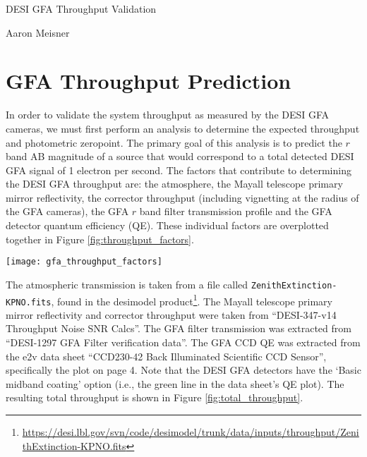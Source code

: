 \documentclass{article}
\begin{document}
\begin{center}
\Large
DESI GFA Throughput Validation
\end{center}

\normalsize

\begin{center}
Aaron Meisner
\end{center}

\section{GFA Throughput Prediction}


In order to validate the system throughput as measured by the DESI GFA cameras, we must first perform an analysis to determine the expected throughput and photometric zeropoint. The primary goal of this analysis is to predict the $r$ band AB magnitude of a source that would correspond to a total detected DESI GFA signal of 1 electron per second. The factors that contribute to determining the DESI GFA throughput are: the atmosphere, the Mayall telescope primary mirror reflectivity, the corrector throughput (including vignetting at the radius of the GFA cameras), the GFA $r$ band filter transmission profile and the GFA detector quantum efficiency (QE). These individual factors are overplotted together in Figure \ref{fig:throughput_factors}.



\begin{figure*}[ht]
        \texttt{[image: gfa\_throughput\_factors]}
    \caption{Summary of the multiplicative factors that contribute to determining the total DESI GFA throughput as a function of wavelength.}
    \label{fig:throughput_factors}
\end{figure*}

The atmospheric transmission is taken from a file called \verb|ZenithExtinction-KPNO.fits|, found in the desimodel product\footnote{\url{https://desi.lbl.gov/svn/code/desimodel/trunk/data/inputs/throughput/ZenithExtinction-KPNO.fits}}. The Mayall telescope primary mirror reflectivity and corrector throughput were taken from ``DESI-347-v14 Throughput Noise SNR Calcs''. The GFA filter transmission was extracted from ``DESI-1297 GFA Filter verification data''. The GFA CCD QE was extracted from the e2v data sheet ``CCD230-42 Back Illuminated Scientific CCD Sensor'', specifically the plot on page 4. Note that the DESI GFA detectors have the `Basic midband coating' option (i.e., the green line in the data sheet's QE plot). The resulting total throughput is shown in Figure \ref{fig:total_throughput}.
\end{document}
